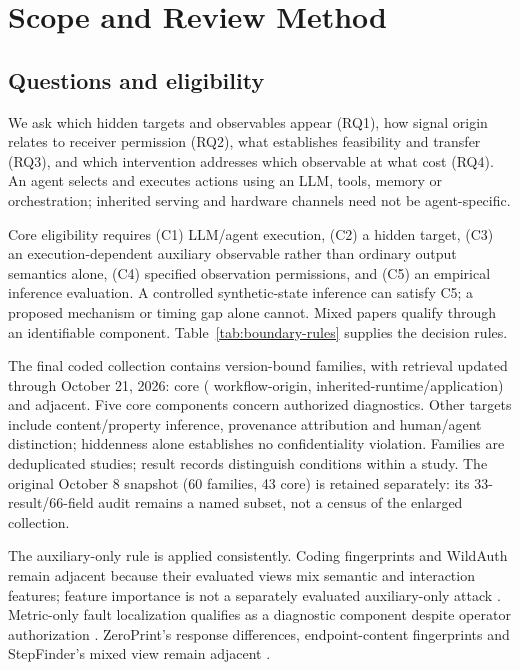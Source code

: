 \section{Scope and Review Method}\label{sec:methodology}\label{sec:background}
\subsection{Questions and eligibility}
We ask which hidden targets and observables appear (RQ1), how signal origin relates to receiver permission (RQ2), what establishes feasibility and transfer (RQ3), and which intervention addresses which observable at what cost (RQ4). An agent selects and executes actions using an LLM, tools, memory or orchestration; inherited serving and hardware channels need not be agent-specific.

Core eligibility requires (C1) LLM/agent execution, (C2) a hidden target, (C3) an execution-dependent auxiliary observable rather than ordinary output semantics alone, (C4) specified observation permissions, and (C5) an empirical inference evaluation. A controlled synthetic-state inference can satisfy C5; a proposed mechanism or timing gap alone cannot. Mixed papers qualify through an identifiable component. Table~\ref{tab:boundary-rules} supplies the decision rules.


The final coded collection contains \FinalN{} version-bound families, with retrieval updated through October 21, 2026: \FinalCore{} core (\FinalA{} workflow-origin, \FinalB{} inherited-runtime/application) and \FinalAdjacent{} adjacent. Five core components concern authorized diagnostics. Other targets include content/property inference, provenance attribution and human/agent distinction; hiddenness alone establishes no confidentiality violation. Families are deduplicated studies; result records distinguish conditions within a study. The original October 8 snapshot (60 families, 43 core) is retained separately: its 33-result/66-field audit remains a named subset, not a census of the enlarged collection.

The auxiliary-only rule is applied consistently. Coding fingerprints and WildAuth remain adjacent because their evaluated views mix semantic and interaction features; feature importance is not a separately evaluated auxiliary-only attack \cite{ghaleb2026codingfingerprint,wang2026dialogue}. Metric-only fault localization qualifies as a diagnostic component despite operator authorization \cite{scheinert2026rca}. ZeroPrint's response differences, endpoint-content fingerprints and StepFinder's mixed view remain adjacent \cite{shao2026zeroprint,leshin2026endpoint,zhu2026stepfinder}.

